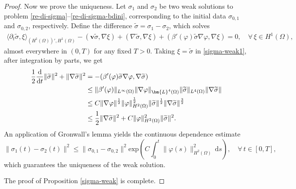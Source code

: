 \documentclass[11pt,reqno]{amsart}
\def\d{{\rm d}}
\def\l{\langle}
\def\r{\rangle}
\def\ddt{\frac{\d}{\d t}}
\def\vv{\bm{v}}
\begin{document}
\begin{proof}
Now we prove the uniqueness. Let $\sigma_1$ and $\sigma_2$ be two weak solutions to problem \eqref{re-di-sigma}--\eqref{re-di-sigma-bdini}, corresponding to the initial data $\sigma_{0,1}$ and $\sigma_{0,2}$, respectively. Define the difference
$\widetilde{\sigma}=\sigma_1-\sigma_2$, which solves
%
\begin{align}
	\label{sigma-weak1}
	\l \partial_t \widetilde{\sigma},\xi\r_{(H^1(\Omega))',H^1(\Omega)}
- ( \vv \widetilde{\sigma},\nabla \xi )
	+(\nabla\widetilde{\sigma},\nabla \xi) + (\beta'(\varphi)\widetilde{\sigma}\nabla \varphi, \nabla \xi )=0,
\quad \forall\, \xi\in H^1(\Omega),
\end{align}
almost everywhere in $(0,T)$ for any fixed $T>0$. Taking $\xi= \widetilde{\sigma}$ in \eqref{sigma-weak1}, after integration by parts, we get
%
\begin{align}
\frac{1}{2}\ddt \|\widetilde{\sigma}\|^2+\|\nabla \widetilde{\sigma}\|^2
&= - (\beta'(\varphi)\widetilde{\sigma}\nabla \varphi,\nabla \widetilde{\sigma})
\notag\\
&\leq \|\beta'(\varphi)\|_{L^\infty(\Omega)}
\|\nabla \varphi\|_{\bm{L}^4(\Omega)}
\|\widetilde{\sigma}\|_{L^4(\Omega)}\|\nabla \widetilde{\sigma}\|
\notag\\
&\leq C\|\nabla \varphi\|^\frac12\|\varphi\|_{H^2(\Omega)}^\frac12\|\widetilde{\sigma}\|^\frac12
\|\nabla \widetilde{\sigma}\|^\frac32
\notag\\
&\leq \frac12 \|\nabla \widetilde{\sigma}\|^2 +C \|\varphi\|_{H^2(\Omega)}^2\|\widetilde{\sigma}\|^2.
\label{sig-uni}
\end{align}
%
An application of Gronwall's lemma yields the continuous dependence estimate
$$
\|\sigma_1(t)-\sigma_2(t)\|^2
\leq \|\sigma_{0,1}-\sigma_{0,2}\|^2 \mathrm{exp}\left(C\int_0^t\|\varphi(s)\|_{H^2(\Omega)}^2\,\mathrm{d}s\right), \quad \forall\, t\in [0,T],
$$
which guarantees the uniqueness of the weak solution.

The proof of Proposition \ref{sigma-weak} is complete.
\end{proof}
\end{document}
